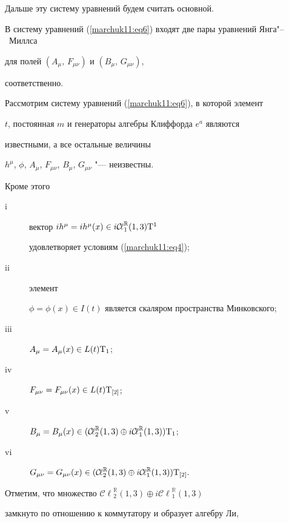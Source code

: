 Дальше эту систему уравнений будем считать основной.

В систему уравнений (\ref{marchuk11:eq6}) входят две пары уравнений Янга"--~Миллса

для полей $(A_\mu, \,F_{\mu\nu})$ и $(B_\mu, \,G_{\mu\nu})$, 

соответственно.



Рассмотрим систему уравнений (\ref{marchuk11:eq6}),  в которой элемент

$t$,  постоянная $m$ и генераторы алгебры Клиффорда $e^a$ являются

известными,  а все остальные величины

$h^\mu$,  $\phi$,  $A_\mu$,  $F_{\mu\nu}$,  $B_\mu$,  $G_{\mu\nu}$ "--- неизвестны.

Кроме этого

\begin{description}

\item[i] вектор $i h^\mu=i h^\mu(x)\in i{\mathcal{C\!\ell}}_1^{\mathbb R}(1, 3){\rm T}^1$

удовлетворяет условиям (\ref{marchuk11:eq4});

\item[ii] элемент

$\phi=\phi(x)\in I(t)$ является скаляром пространства Минковского;

\item[iii] $A_\mu=A_\mu(x)\in L(t){\rm T}_1$;

\item[iv] $F_{\mu\nu}=F_{\mu\nu}(x)\in L(t){\rm T}_{[2]}$;

\item[v] $B_\mu=B_\mu(x)\in({\mathcal{C\!\ell}}_2^{\mathbb R}(1, 3)\oplus i{\mathcal{C\!\ell}}_1^{\mathbb R}(1, 3)){\rm T}_1$;

\item[vi] $G_{\mu\nu}=G_{\mu\nu}(x)\in({\mathcal{C\!\ell}}_2^{\mathbb R}(1, 3)\oplus

i{\mathcal{C\!\ell}}_1^{\mathbb R}(1, 3)){\rm T}_{[2]}.$

\end{description}



Отметим,  что множество ${\mathcal{C\!\ell}}_2^{\mathbb R}(1, 3)\oplus i{\mathcal{C\!\ell}}_1^{\mathbb R}(1, 3)$

замкнуто по отношению  к коммутатору  и образует алгебру Ли, 

